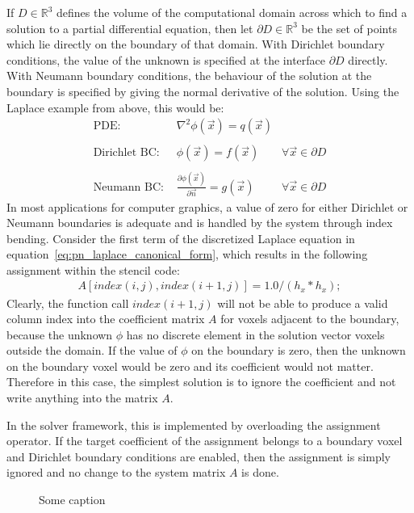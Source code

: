 If $D\in\mathbb{R}^3$ defines the volume of the computational domain across which to find a solution to a partial differential equation, then let $\partial D\in\mathbb{R}^3$ be the set of points which lie directly on the boundary of that domain. With Dirichlet boundary conditions, the value of the unknown is specified at the interface $\partial D$ directly. With Neumann boundary conditions, the behaviour of the solution at the boundary is specified by giving the normal derivative of the solution. Using the Laplace example from above, this would be:
\begin{align*}
\text{PDE:\ \ } & \nabla^2\phi\left(\vec{x}\right) = q\left(\vec{x}\right)
&
\\
\\
\text{Dirichlet BC:\ \ } & \phi\left(\vec{x}\right) = f\left(\vec{x}\right)
&\forall \vec{x}\in\partial D
\\
\\
\text{Neumann BC:\ \ } & \frac{\partial\phi\left(\vec{x}\right)}{\partial\vec{n}} = g\left(\vec{x}\right)
&\forall \vec{x}\in\partial D
\end{align*}
In most applications for computer graphics, a value of zero for either Dirichlet or Neumann boundaries is adequate and is handled by the system through index bending. Consider the first term of the discretized Laplace equation in equation~\ref{eq:pn_laplace_canonical_form}, which results in the following assignment within the stencil code:
\begin{align}
A[index(i,j), index(i+1, j)] = 1.0/(h_x*h_x);
\end{align}
Clearly, the function call $index(i+1, j)$ will not be able to produce a valid column index into the coefficient matrix $A$ for voxels adjacent to the boundary, because the unknown $\phi$ has no discrete element in the solution vector voxels outside the domain. If the value of $\phi$ on the boundary is zero, then the unknown on the boundary voxel would be zero and its coefficient would not matter. Therefore in this case, the simplest solution is to ignore the coefficient and not write anything into the matrix $A$.

In the solver framework, this is implemented by overloading the assignment operator. If the target coefficient of the assignment belongs to a boundary voxel and Dirichlet boundary conditions are enabled, then the assignment is simply ignored and no change to the system matrix $A$ is done.
\begin{figure}[h]
\centering
{}
\caption{Some caption}
\label{fig:pn_bc_dirichlet}
\end{figure}

